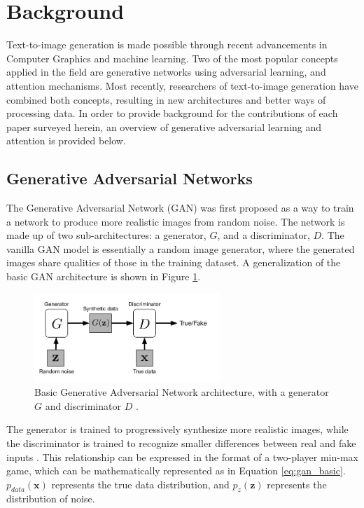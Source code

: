 \documentclass[letterpaper]{article} %
\begin{document}
\section{Background}
\label{sec:background}
Text-to-image generation is made possible through recent advancements in 
Computer Graphics and machine learning.
Two of the most popular concepts applied in the field are generative networks 
using adversarial learning, and attention mechanisms.
Most recently, researchers of text-to-image generation 
have combined both concepts, resulting in new architectures and better ways of 
processing data. In order to provide background for the contributions of each 
paper surveyed herein, an overview of generative adversarial learning and 
attention is provided below.

\subsection{Generative Adversarial Networks}
The Generative Adversarial Network (GAN)
was first proposed as a way to train a network to produce more realistic images
from random noise. The network is made up of two sub-architectures:
a generator, $G$, and a discriminator, $D$. The vanilla GAN model is 
essentially a random image generator, where the generated images share 
qualities of those in the training dataset. A generalization of the basic GAN 
architecture is shown in Figure \ref{fig:gan}.

\begin{figure}[htbp]
\centerline{\includegraphics[width=7cm]{gan.png}}
\caption{Basic Generative Adversarial Network architecture, with a 
generator $G$
and discriminator $D$
\cite{cgan}.}
\label{fig:gan}
\end{figure}

The generator is trained to progressively synthesize more realistic images,
while the discriminator is trained to recognize smaller differences between 
real and fake inputs \cite{cgan}. This relationship can be expressed in the 
format of a two-player min-max game, which can be mathematically 
represented as in Equation \ref{eq:gan_basic}.
$p_{data}(\mathbf{x})$ represents the true data distribution,
and $p_{z}(\mathbf{z})$ represents the distribution of noise.
\end{document}
